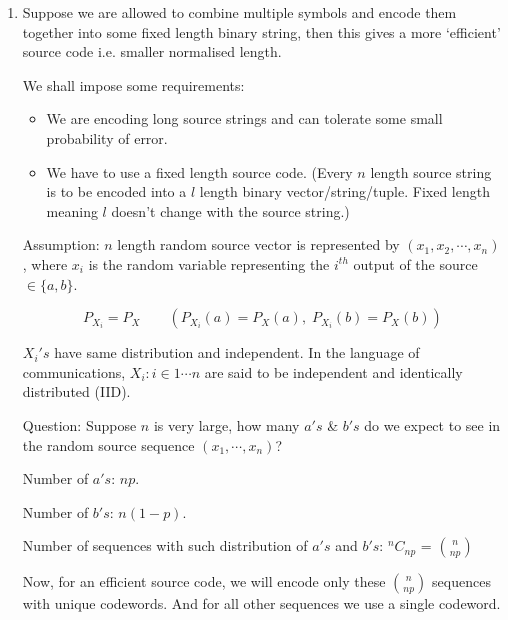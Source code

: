 \documentclass{article}
\newcommand*{\Comb}[2]{{}^{#1}C_{#2}}%
\begin{document}
\begin{enumerate}
    \item Suppose we are allowed to combine multiple symbols and encode them together into some fixed length binary string, then this gives a more `efficient' source code i.e. smaller normalised length.

    We shall impose some requirements:
    \begin{itemize}
        \item We are encoding long source strings and can tolerate some small probability of error.
        \item We have to use a fixed length source code. (Every $n$ length source string is to be encoded into a $l$ length binary vector/string/tuple. Fixed length meaning $l$ doesn't change with the source string.)
    \end{itemize}
    Assumption: $n$ length random source vector is represented by $(x_1,x_2,\cdots,x_n)$, where $x_i$ is the random variable representing the $i^{th}$ output of the source $\in \{a,b\}$.

    $$ P_{X_i}= P_X \qquad (P_{X_i}(a)= P_X(a),\;P_{X_i}(b)= P_X(b))$$

    $X_i's$ have same distribution and independent. In the language of communications, $X_i : i \in 1\cdots n$ are said to be independent and identically distributed (IID).

    Question: Suppose $n$ is very large, how many $a's$ \& $b's$ do we expect to see in the random source sequence $(x_1,\cdots, x_n)$?

    Number of $a's$: $np$.

    Number of $b's$: $n(1-p)$.

    Number of sequences with such distribution of $a's$ and $b's$: $\Comb{n}{np}$ = $n \choose np$

    Now, for an efficient source code, we will encode only these $n \choose np$ sequences with unique codewords. And for all other sequences we use a single codeword. 

\end{enumerate}
\end{document}
